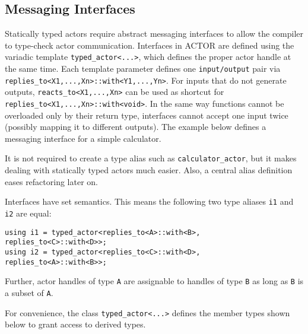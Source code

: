 \clearpage
\subsection{Messaging Interfaces}
\label{interface}

Statically typed actors require abstract messaging interfaces to allow the
compiler to type-check actor communication. Interfaces in ACTOR are defined using
the variadic template \lstinline^typed_actor<...>^, which defines the proper
actor handle at the same time. Each template parameter defines one
\lstinline^input/output^ pair via
\lstinline^replies_to<X1,...,Xn>::with<Y1,...,Yn>^. For inputs that do not
generate outputs, \lstinline^reacts_to<X1,...,Xn>^ can be used as shortcut for
\lstinline^replies_to<X1,...,Xn>::with<void>^. In the same way functions cannot
be overloaded only by their return type, interfaces cannot accept one input
twice (possibly mapping it to different outputs). The example below defines a
messaging interface for a simple calculator.


It is not required to create a type alias such as \lstinline^calculator_actor^,
but it makes dealing with statically typed actors much easier. Also, a central
alias definition eases refactoring later on.

Interfaces have set semantics. This means the following two type aliases
\lstinline^i1^ and \lstinline^i2^ are equal:

\begin{lstlisting}
using i1 = typed_actor<replies_to<A>::with<B>, replies_to<C>::with<D>>;
using i2 = typed_actor<replies_to<C>::with<D>, replies_to<A>::with<B>>;
\end{lstlisting}

Further, actor handles of type \lstinline^A^ are assignable to handles of type
\lstinline^B^ as long as \lstinline^B^ is a subset of \lstinline^A^.

For convenience, the class \lstinline^typed_actor<...>^ defines the member
types shown below to grant access to derived types.

